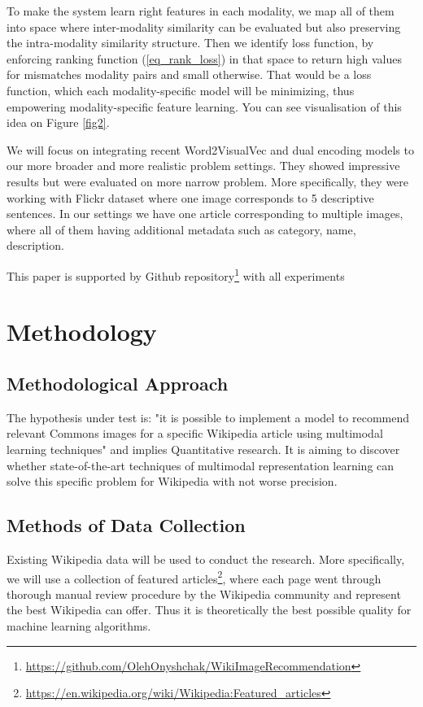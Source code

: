 \documentclass[runningheads]{llncs}
\begin{document}
To make the system learn right features in each modality, we map all of them into space where inter-modality similarity can be evaluated but also preserving the intra-modality similarity structure\cite{ref_cross_modal_hash}\cite{ref_devise}\cite{ref_kiros}. Then we identify loss function, by enforcing ranking function (\ref{eq_rank_loss}) in that space to return high values for mismatches modality pairs and small otherwise. That would be a loss function, which each modality-specific model will be minimizing, thus empowering modality-specific feature learning. You can see visualisation of this idea on Figure \ref{fig2}.

We will focus on integrating recent Word2VisualVec\cite{ref_w2vv} and dual encoding\cite{ref_dual_encoding} models to our more broader and more realistic problem settings. They showed impressive results but were evaluated on more narrow problem. More specifically, they were working with Flickr dataset\cite{ref_flickr} where one image corresponds to 5 descriptive sentences. In our settings we have one article corresponding to multiple images, where all of them having additional metadata such as category, name, description.

This paper is supported by Github repository\footnote{\url{https://github.com/OlehOnyshchak/WikiImageRecommendation}} with all experiments

\section{Methodology}
\subsection{Methodological Approach}
The hypothesis under test is: "it is possible to implement a model to recommend relevant Commons\cite{ref_wiki_commons} images for a specific Wikipedia article using multimodal learning techniques" and implies Quantitative research. It is aiming to discover whether state-of-the-art techniques of multimodal representation learning can solve this specific problem for Wikipedia with not worse precision. 

\subsection{Methods of Data Collection}
Existing Wikipedia data will be used to conduct the research. More specifically, we will use a collection of featured articles\footnote{\url{https://en.wikipedia.org/wiki/Wikipedia:Featured_articles}}, where each page went through thorough manual review procedure by the Wikipedia community and represent the best Wikipedia can offer. Thus it is theoretically the best possible quality for machine learning algorithms.
\end{document}
